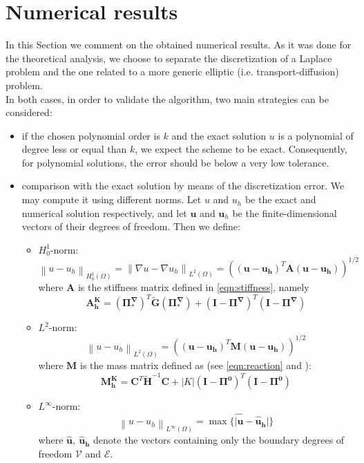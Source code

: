 \documentclass[10pt]{article}
\newcommand{\norm}[2]{\left\lVert#1\right\rVert_{#2}}
\newcommand{\mymatrix}[1]{\mathbf{#1}}
\begin{document}
\newpage

\section{Numerical results} \label{sec:results}
In this Section we comment on the obtained numerical results. As it was done for the theoretical analysis, we choose to separate the discretization of a Laplace problem and the one related to a more generic elliptic (i.e. transport-diffusion) problem. \\
In both cases, in order to validate the algorithm, two main strategies can be considered:
\begin{itemize}
	\item if the chosen polynomial order is $k$ and the exact solution $u$ is a polynomial of degree less or equal than $k$, we expect the scheme to be exact. Consequently, for polynomial solutions, the error should be below a very low tolerance.
	\item comparison with the exact solution by means of the discretization error. We may compute it using different norms. Let $u$ and $u_h$ be the exact and numerical solution respectively, and let $\mathbf{u}$ and $\mathbf{u}_h$ be the finite-dimensional vectors of their degrees of freedom. Then we define:
	\begin{itemize}
		\item $H^1_0$-norm: $$\norm{u-u_h}{H_0^1(\Omega)}=\norm{\nabla u-\nabla u_h}{L^2(\Omega)}=\left( (\mathbf{u}-\mathbf{u_h})^T \mymatrix{A} (\mathbf{u}-\mathbf{u_h}) \right)^{1/2} $$
where $\mymatrix{A}$ is the stiffness matrix defined in \eqref{eqn:stiffness}, namely
	$$\mymatrix{A_h^K}=(\mymatrix{\Pi_*^\nabla})^T \mymatrix{\tilde{G}} (\mymatrix{\Pi_*^\nabla})+(\mymatrix{I}-\mymatrix{\Pi^\nabla})^T(\mymatrix{I}-\mymatrix{\Pi^\nabla})$$
		\item $L^2$-norm: $$\norm{u-u_h}{L^2(\Omega)}=\left( (\mathbf{u}-\mathbf{u_h})^T \mymatrix{M} (\mathbf{u}-\mathbf{u_h}) \right)^{1/2} $$
		where $\mymatrix{M}$ is the mass matrix defined as (see \eqref{eqn:reaction} and \cite{hitchhiker}):
		$$	\mymatrix{M_h^K}=\mymatrix{C}^T \mymatrix{\tilde{H}}^{-1} \mymatrix{C}+|K|(\mymatrix{I}-\mymatrix{\Pi^0})^T(\mymatrix{I}-\mymatrix{\Pi^0})
		$$
		\item $L^\infty$-norm: $$\norm{u-u_h}{L^\infty(\Omega)}=\max \lbrace \hat{|\mathbf{u}}-\hat{\mathbf{u}}_\mathbf{h}| \rbrace$$
		where $\hat{\mathbf{u}}, \ \hat{\mathbf{u}}_\mathbf{h}$ denote the vectors containing only the boundary degrees of freedom $\mathcal{V}$ and $\mathcal{E}$.

\end{itemize}
\end{itemize}
\end{document}
